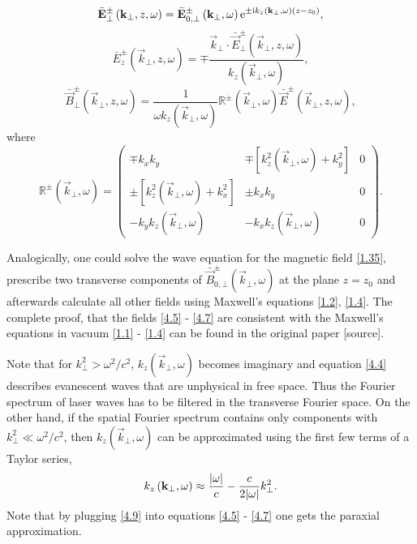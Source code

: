 \begin{equation}
\label{4.5}
\bar{\mathbf{E}}^{\pm}_{\bot} \left(\mathbf{k}_\bot, z, \omega \right) = \bar{\mathbf{E}}^{\pm}_{0, \bot} \left(\mathbf{k}_\bot, \omega \right) \mathrm{e}^{\pm \mathrm{i} k_z \left(\mathbf{k}_\bot, \omega \right) \left(z - z_0 \right)},
\end{equation}
\begin{equation}
\label{4.6}
\bar{E}^{\pm}_z \left(\vec{k}_\bot, z, \omega \right) = \mp \frac{\vec{k}_\bot \cdot \bar{\vec{E}}^{\pm}_{\bot}(\vec{k}_\bot, z, \omega)}{k_z \left(\vec{k}_\bot, \omega \right)},
\end{equation}
\begin{equation}
\label{4.7}
\bar{\vec{B}}^{\pm}_{\bot} \left(\vec{k}_\bot, z, \omega \right) = \frac{1}{\omega k_z \left(\vec{k}_\bot, \omega \right)} \mathbb{R}^{\pm} \left(\vec{k}_\bot, \omega \right) \bar{\vec{E}}^{\pm} \left(\vec{k}_\bot, z, \omega \right),
\end{equation}
where
\begingroup
\renewcommand*{\arraystretch}{1.7}
\begin{equation}
\label{4.8}
\mathbb{R}^{\pm} \left(\vec{k}_\bot, \omega \right) =  \begin{pmatrix}
\mp k_x k_y & \mp \left[ k_z^2 \left(\vec{k}_\bot, \omega \right) + k_y^2 \right] & 0 \\
\pm \left[ k_z^2 \left(\vec{k}_\bot, \omega \right) + k_x^2 \right] & \pm k_x k_y & 0 \\
- k_y k_z \left(\vec{k}_\bot, \omega \right) & - k_x k_z \left(\vec{k}_\bot, \omega \right) & 0
\end{pmatrix}.
\end{equation} 
\endgroup

Analogically, one could solve the wave equation for the magnetic field \ref{1.35}, prescribe two transverse components of $ \bar{\vec{B}}_{0, \bot}^{\pm}\left(\vec{k}_\bot, \omega \right) $ at the plane $ z = z_0 $ and afterwards calculate all other fields using Maxwell's equations \ref{1.2}, \ref{1.4}. The complete proof, that the fields \ref{4.5} - \ref{4.7} are consistent with the Maxwell's equations in vacuum \ref{1.1} - \ref{1.4} can be found in the original paper [source].

Note that for $ k_\bot^2 > \omega^2/c^2 $, $ k_z \left(\vec{k}_\bot, \omega \right) $ becomes imaginary and equation \ref{4.4} describes evanescent waves that are unphysical in free space. Thus the Fourier spectrum of laser waves has to be filtered in the transverse Fourier space. On the other hand, if the spatial Fourier spectrum contains only components with $ k_\bot^2 \ll \omega^2/c^2 $, then $ k_z \left(\vec{k}_\bot, \omega \right) $ can be approximated using the first few terms of a Taylor series,
\begin{equation}
\label{4.9}
k_z \left(\mathbf{k}_\bot, \omega \right) \approx \frac{\lvert\omega\rvert}{c} - \frac{c}{2 \lvert\omega\rvert} k_\bot^2.
\end{equation}
Note that by plugging \ref{4.9} into equations \ref{4.5} - \ref{4.7} one gets the paraxial approximation.

